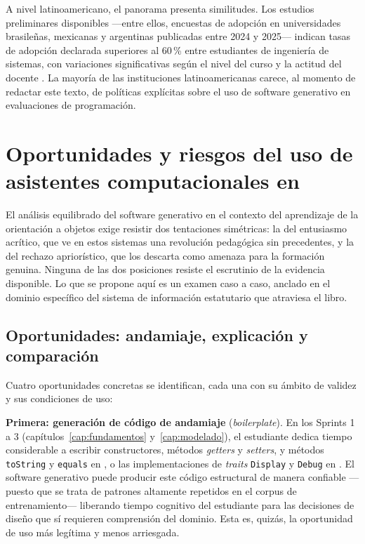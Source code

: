 A nivel latinoamericano, el panorama presenta similitudes. Los estudios
preliminares disponibles ---entre ellos, encuestas de adopción en universidades
brasileñas, mexicanas y argentinas publicadas entre 2024 y 2025--- indican
tasas de adopción declarada superiores al 60\,\% entre estudiantes de ingeniería
de sistemas, con variaciones significativas según el nivel del curso y la
actitud del docente \parencite{Bloch2018}. La mayoría de las instituciones
latinoamericanas carece, al momento de redactar este texto, de políticas
explícitas sobre el uso de software generativo en evaluaciones de programación.

\section{Oportunidades y riesgos del uso de asistentes computacionales en \poo}
\label{sec:oportunidades-riesgos}

\noindent
El análisis equilibrado del software generativo en el contexto del aprendizaje
de la orientación a objetos exige resistir dos tentaciones simétricas: la del
entusiasmo acrítico, que ve en estos sistemas una revolución pedagógica sin
precedentes, y la del rechazo apriorístico, que los descarta como amenaza para
la formación genuina. Ninguna de las dos posiciones resiste el escrutinio de
la evidencia disponible. Lo que se propone aquí es un examen caso a caso,
anclado en el dominio específico del sistema de información estatutario
que atraviesa el libro.

\subsection{Oportunidades: andamiaje, explicación y comparación}
\label{subsec:oportunidades}

Cuatro oportunidades concretas se identifican, cada una con su ámbito de validez
y sus condiciones de uso:

\textbf{Primera: generación de código de andamiaje} (\textit{boilerplate}).
En los Sprints 1 a 3 (capítulos~\ref{cap:fundamentos} y~\ref{cap:modelado}),
el estudiante dedica tiempo considerable a escribir constructores, métodos
\textit{getters} y \textit{setters}, y métodos \texttt{toString} y \texttt{equals}
en \java, o las implementaciones de \textit{traits} \texttt{Display} y \texttt{Debug}
en \rust. El software generativo puede producir este código estructural de
manera confiable ---puesto que se trata de patrones altamente repetidos en el
corpus de entrenamiento--- liberando tiempo cognitivo del estudiante para las
decisiones de diseño que sí requieren comprensión del dominio. Esta es, quizás,
la oportunidad de uso más legítima y menos arriesgada.


